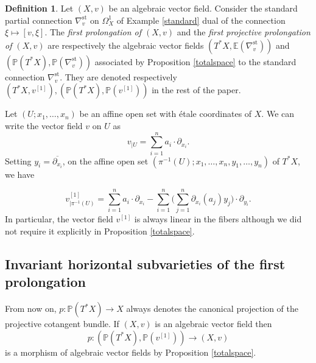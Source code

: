 \documentclass[12pt]{amsart}
\renewcommand{\P}{\mathbb{P}}
\theoremstyle{definition}
\newtheorem{definition}{Definition}[subsection]
\theoremstyle{plain}
\theoremstyle{exampstyle}
\theoremstyle{exampstyle}\newtheorem{thmxbis}{Theorem}
\numberwithin{equation}{section}
\theoremstyle{remark}
\begin{document}
\begin{definition} 
Let $(X,v)$ be an algebraic vector field. Consider the standard partial connection $\nabla^{\mathrm{st}}_v$ on $\Omega^1_X$ of Example \ref{standard} dual of the connection 
$\xi \mapsto [v, \xi]$.
The {\em{first prolongation of $(X,v)$}} and the {\em first projective prolongation of $(X,v)$} are respectively the algebraic vector fields $(T^\ast X, \mathbb{E}(\nabla^{\mathrm{st}}_v))$ and $(\P(T^\ast X), \P(\nabla^{\mathrm{st}}_v))$ associated by Proposition \ref{totalspace} to the standard connection $\nabla^{\mathrm{st}}_v$. They are denoted respectively
$(T^\ast X, v^{[1]}), (\P(T^\ast X), \P(v^{[1]})) $ in the rest of the paper.  
\end{definition}

{\label{local-expression} Let $(U;x_1,\ldots, x_n)$ be an affine open set with étale coordinates of $X$. We can write the vector field $v$ on $U$ as
$$ v_{\mid U} = \sum_{i = 1}^n a_i \cdot \partial_{x_i}.$$
Setting $y_i = \overline{\partial_{x_i}}$, on the affine open set $(\pi^{-1}(U); x_1,\ldots, x_n,y_1,\ldots, y_n)$ of $T^\ast X$, we have 

$$ v^{[1]}_{\mid \pi^{-1}(U)} = \sum_{i = 1}^n a_i \cdot \partial_{x_i} - \sum_{i = 1}^n \Big( \sum_{j = 1}^n \partial_{x_i}(a_j)y_j \Big) \cdot \partial_{y_i}.$$
In particular, the vector field $v^{[1]}$ is always linear in the fibers although we did not require it explicitly in Proposition \ref{totalspace}. 
} 

%

\subsection{Invariant horizontal subvarieties of the first prolongation} From now on, $p : \mathbb{P}(T^\ast X) \rightarrow X$ always denotes the canonical projection of the projective cotangent bundle. If $(X,v)$ is an algebraic vector field then 
$$p : (\mathbb{P}(T^\ast X),\P(v^{[1]})) \rightarrow (X,v)$$
is a morphism of algebraic vector fields by Proposition \ref{totalspace}. 
\end{document}
